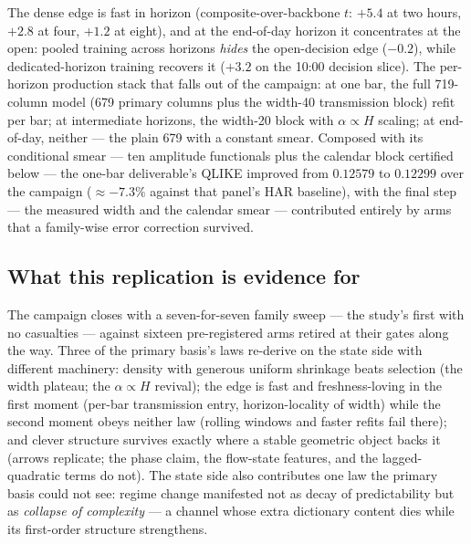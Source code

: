 The dense edge is fast in horizon (composite-over-backbone $t$: $+5.4$ at two
hours, $+2.8$ at four, $+1.2$ at eight), and at the end-of-day horizon it
concentrates at the open: pooled training across horizons \emph{hides} the
open-decision edge ($-0.2$), while dedicated-horizon training recovers it
($+3.2$ on the 10:00 decision slice). The per-horizon production stack that
falls out of the campaign: at one bar, the full 719-column model (679 primary
columns plus the width-40 transmission block) refit per bar; at intermediate
horizons, the width-20 block with $\alpha \propto H$ scaling; at end-of-day,
neither --- the plain 679 with a constant smear. Composed with its conditional
smear --- ten amplitude functionals plus the calendar block certified below ---
the one-bar deliverable's QLIKE improved from $0.12579$ to $0.12299$ over the
campaign ($\approx -7.3\%$ against that panel's HAR baseline), with the final
step --- the measured width and the calendar smear --- contributed entirely by
arms that a family-wise error correction survived.

\subsection{What this replication is evidence for}
\label{sec:replication-summary}

The campaign closes with a seven-for-seven family sweep --- the study's first
with no casualties --- against sixteen pre-registered arms retired at their
gates along the way. Three of the primary basis's laws re-derive on the state
side with different machinery: density with generous uniform shrinkage beats
selection (the width plateau; the $\alpha \propto H$ revival); the edge is
fast and freshness-loving in the first moment (per-bar transmission entry,
horizon-locality of width) while the second moment obeys neither law (rolling
windows and faster refits fail there); and clever structure survives exactly
where a stable geometric object backs it (arrows replicate; the phase claim,
the flow-state features, and the lagged-quadratic terms do not). The state
side also contributes one law the primary basis could not see: regime change
manifested not as decay of predictability but as \emph{collapse of
complexity} --- a channel whose extra dictionary content dies while its
first-order structure strengthens.
